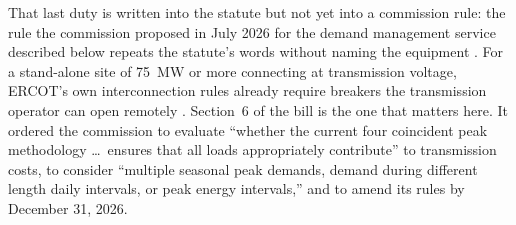 That last duty is written into the statute but not yet into a commission rule: the rule the commission proposed in July 2026 for the demand management service described below repeats the statute's words without naming the equipment \autocite{puct2026prop58482,puct2026sb6roadmap}. %
For a stand-alone site of 75~MW or more connecting at transmission voltage, ERCOT's own interconnection rules already require breakers the transmission operator can open remotely \autocite{ercotplanningguide2026,ercot2026protocols}. %
Section~6 of the bill is the one that matters here. It ordered the commission to evaluate ``whether the current four coincident peak methodology \ldots\ ensures that all loads appropriately contribute'' to transmission costs, to consider ``multiple seasonal peak demands, demand during different length daily intervals, or peak energy intervals,'' and to amend its rules by December 31, 2026. %


